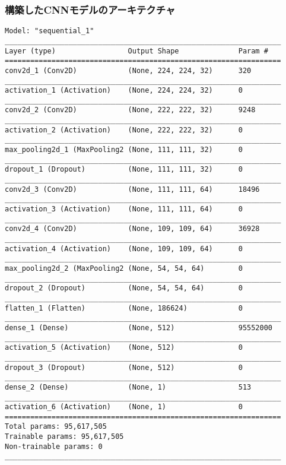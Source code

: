 \documentclass{article}
\begin{document}
\subsubsection{構築したCNNモデルのアーキテクチャ}
\begin{lstlisting}
Model: "sequential_1"
_________________________________________________________________
Layer (type)                 Output Shape              Param #   
=================================================================
conv2d_1 (Conv2D)            (None, 224, 224, 32)      320       
_________________________________________________________________
activation_1 (Activation)    (None, 224, 224, 32)      0         
_________________________________________________________________
conv2d_2 (Conv2D)            (None, 222, 222, 32)      9248      
_________________________________________________________________
activation_2 (Activation)    (None, 222, 222, 32)      0         
_________________________________________________________________
max_pooling2d_1 (MaxPooling2 (None, 111, 111, 32)      0         
_________________________________________________________________
dropout_1 (Dropout)          (None, 111, 111, 32)      0         
_________________________________________________________________
conv2d_3 (Conv2D)            (None, 111, 111, 64)      18496     
_________________________________________________________________
activation_3 (Activation)    (None, 111, 111, 64)      0         
_________________________________________________________________
conv2d_4 (Conv2D)            (None, 109, 109, 64)      36928     
_________________________________________________________________
activation_4 (Activation)    (None, 109, 109, 64)      0         
_________________________________________________________________
max_pooling2d_2 (MaxPooling2 (None, 54, 54, 64)        0         
_________________________________________________________________
dropout_2 (Dropout)          (None, 54, 54, 64)        0         
_________________________________________________________________
flatten_1 (Flatten)          (None, 186624)            0         
_________________________________________________________________
dense_1 (Dense)              (None, 512)               95552000  
_________________________________________________________________
activation_5 (Activation)    (None, 512)               0         
_________________________________________________________________
dropout_3 (Dropout)          (None, 512)               0         
_________________________________________________________________
dense_2 (Dense)              (None, 1)                 513       
_________________________________________________________________
activation_6 (Activation)    (None, 1)                 0         
=================================================================
Total params: 95,617,505
Trainable params: 95,617,505
Non-trainable params: 0
_________________________________________________________________
\end{lstlisting}
\end{document}
